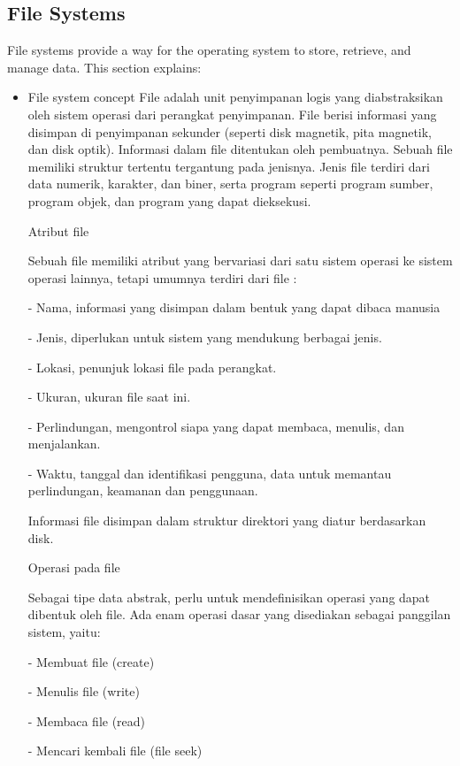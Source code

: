 \documentclass[12pt]{article}
\begin{document}
\subsection{File Systems}
File systems provide a way for the operating system to store, retrieve, and manage data. This section explains:
\begin{itemize}
    \item File system concept
    File adalah unit penyimpanan logis yang diabstraksikan oleh sistem operasi dari perangkat penyimpanan. File berisi informasi yang disimpan di penyimpanan sekunder (seperti disk magnetik, pita magnetik, dan disk optik). Informasi dalam file ditentukan oleh pembuatnya. Sebuah file memiliki struktur tertentu tergantung pada jenisnya. Jenis file terdiri dari data numerik, karakter, dan biner, serta program seperti program sumber, program objek, dan program yang dapat dieksekusi.
    
    Atribut file 

    Sebuah file memiliki atribut yang bervariasi dari satu sistem operasi ke sistem operasi lainnya, tetapi umumnya terdiri dari file : 

    - Nama, informasi yang disimpan dalam bentuk yang dapat dibaca manusia  
    
    - Jenis, diperlukan untuk sistem yang mendukung berbagai jenis. 
    
     - Lokasi, penunjuk lokasi file pada perangkat. 
    
     - Ukuran, ukuran file saat ini. 
    
     - Perlindungan, mengontrol siapa yang dapat membaca, menulis, dan menjalankan. 
    
      - Waktu, tanggal dan identifikasi pengguna, data untuk memantau perlindungan, keamanan dan penggunaan. 

        Informasi file disimpan dalam struktur direktori yang diatur berdasarkan disk. 
    
        Operasi pada file 
    
             	Sebagai tipe data abstrak, perlu untuk mendefinisikan operasi yang dapat dibentuk oleh file. Ada enam operasi dasar yang disediakan sebagai panggilan sistem, yaitu: 
    
     		- Membuat file (create)  
    
     		- Menulis file (write)  
    
     		- Membaca file (read) 
    
     		- Mencari kembali file (file seek) 
    

\end{itemize}
\end{document}
